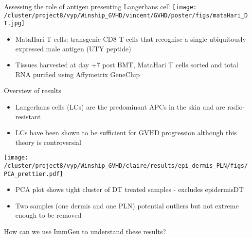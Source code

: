 \documentclass[final,hyperref={pdfpagelabels=false}]{beamer}
\begin{document}
\begin{frame}{}
\begin{columns}[t]
\begin{column}{.36\linewidth}
\begin{block}{Assessing the role of antigen presenting Langerhans cell}
   \texttt{[image: /cluster/project8/vyp/Winship\_GVHD/vincent/GVHD/poster/figs/mataHari\_DT.jpg]}
    {\small
\begin{itemize}
\item MataHari T cells: transgenic CD8 T cells that recognise a single ubiquitously-expressed male antigen (UTY peptide)
\item Tissues harvested at day +7 post BMT, MataHari T cells sorted and total RNA purified using Affymetrix GeneChip
\end{itemize}
}
\end{block}

    \begin{block}{Overview of results}


{\small	\begin{itemize} %
\item Langerhans cells (LCs) are the predominant APCs in the skin and are radio-resistant  
\item LCs have been shown to be sufficient for GVHD progression although this theory is controversial  
\end{itemize}}

\hfill

\begin{minipage}{0.6\textwidth}
       \texttt{[image: /cluster/project8/vyp/Winship\_GVHD/claire/results/epi\_dermis\_PLN/figs/PCA\_prettier.pdf]}
      \end{minipage}
\begin{minipage}{0.3\textwidth}
{\small
      \begin{itemize}
      \item PCA plot shows tight cluster of DT treated samples - excludes epidermisDT
      \item Two samples (one dermis and one PLN) potential outliers but not extreme enough to be removed 
      \end{itemize}}
\end{minipage}
\end{block}

    \begin{block}{How can we use ImmGen to understand these results?}
  

\end{block}
\end{column}
\end{columns}
\end{frame}
\end{document}

